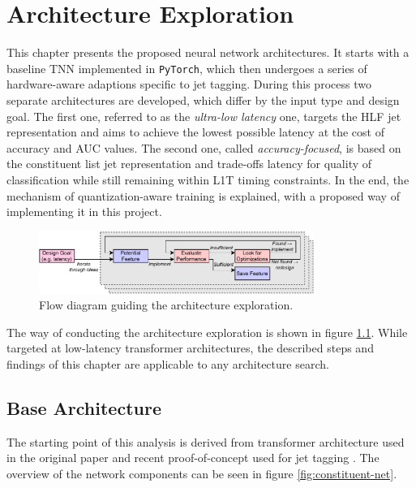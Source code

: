 \chapter{Architecture Exploration}\label{models}
This chapter presents the proposed neural network architectures. It starts with a baseline TNN implemented in \texttt{PyTorch}, which then undergoes a series of hardware-aware adaptions specific to jet tagging. During this process two separate architectures are developed, which differ by the input type and design goal. The first one, referred to as the \textit{ultra-low latency} one, targets the HLF jet representation and aims to achieve the lowest possible latency at the cost of accuracy and AUC values. The second one, called \textit{accuracy-focused}, is based on the constituent list jet representation and trade-offs latency for quality of classification while still remaining within L1T timing constraints. In the end, the mechanism of quantization-aware training is explained, with a proposed way of implementing it in this project.

\begin{figure}[hpt!]
  \centering
  \includegraphics[trim={0cm 0cm 0cm 0cm}, width=0.8\textwidth, center]{models/architecture_exploration.pdf}
  \caption{Flow diagram guiding the architecture exploration.}
  \label{fig:architecture-exploration}
\end{figure}

The way of conducting the architecture exploration is shown in figure \ref{fig:architecture-exploration}. While targeted at low-latency transformer architectures, the described steps and findings of this chapter are applicable to any architecture search.

\section{Base Architecture}
The starting point of this analysis is derived from transformer architecture used in the original paper \cite{44-vaswani2017attention} and recent proof-of-concept used for jet tagging \cite{3-yuan2021msc}. The overview of the network components can be seen in figure \ref{fig:constituent-net}.

